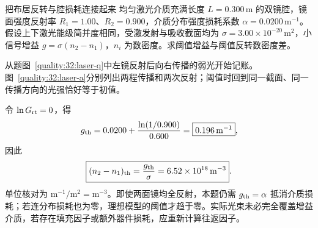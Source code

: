 \begin{origexamplebox}{把布居反转与腔损耗连接起来}\label{quality:32:ex:laser-threshold}
均匀激光介质充满长度 $L=0.300\,\mathrm m$ 的双镜腔，镜面强度反射率 $R_1=1.00$、$R_2=0.900$，介质分布强度损耗系数 $\alpha=0.0200\,\mathrm{m^{-1}}$。假设上下激光能级简并度相同，受激发射与吸收截面均为 $\sigma=3.00\times10^{-20}\,\mathrm{m^2}$，小信号增益 $g=\sigma(n_2-n_1)$，$n_i$ 为数密度。求阈值增益与阈值反转数密度差。
\begin{qualityfigure}
\label{quality:32:laser-q}
\end{qualityfigure}
\end{origexamplebox}
\begin{xesolution}
从题图~\ref{quality:32:laser-q}中左镜反射后向右传播的弱光开始记账。图~\ref{quality:32:laser-a}分别列出两程传播和两次反射；阈值时回到同一截面、同一传播方向的光强恰好等于初值。
\begin{qualityfigure}
\label{quality:32:laser-a}
\end{qualityfigure}
令 $\ln G_{\rm rt}=0$，得
\[
 g_{\rm th}=0.0200+\frac{\ln(1/0.900)}{0.600}
 =\boxed{0.196\,\mathrm{m^{-1}}},
\]
因此
\[
 \boxed{(n_2-n_1)_{\rm th}=\frac{g_{\rm th}}\sigma
 =6.52\times10^{18}\,\mathrm{m^{-3}}}.
\]
单位核对为 $\mathrm{m^{-1}/m^2=m^{-3}}$。即使两面镜均全反射，本题仍需 $g_{\rm th}=\alpha$ 抵消介质损耗；若连分布损耗也为零，理想模型的阈值才趋于零。实际光束未必完全覆盖增益介质，若存在填充因子或额外器件损耗，应重新计算往返因子。
\end{xesolution}
